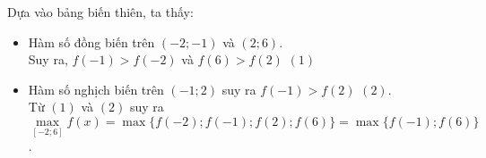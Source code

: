 \begin{ex}
{\begin{center}
		\end{center}
		Dựa vào bảng biến thiên, ta thấy: 
		\begin{itemize}
			\item Hàm số đồng biến trên $\left(-2;-1\right)$  và $\left(2;6\right)$.\\
			Suy ra, $f(-1)>f(-2)$ và $f(6)>f(2)$  $(1)$
			\item Hàm số nghịch biến trên $\left(-1;2\right)$ suy ra $f(-1)>f(2)$  $(2)$.\\
			Từ $(1)$ và $(2)$ suy ra  $\underset{[-2;6]}{\max}f(x)=\max\{f(-2);f(-1);f(2);f(6)\}=\max\{f(-1);f(6)\}$.
		\end{itemize} 
	}
\end{ex}

